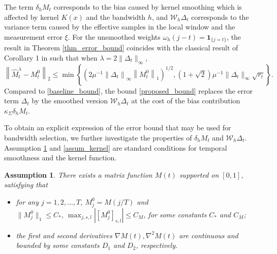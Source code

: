 \documentclass[12pt]{article}
\newtheorem{assump}{Assumption}
\begin{document}
  The term $\delta_h M_t$ corresponds to the bias caused by kernel smoothing which is affected by kernel $K(x)$ and the bandwidth $h$, and $\mathcal{W}_h\Delta_{t}$ corresponds to the variance term caused by the effective samples in the local window and the measurement error $\xi$. 
  For the unsmoothed weights $\omega_h(j-t)=\mathbf{1}_{\{j=t\}}$, the result in Theorem \ref{thm_error_bound} coincides with the classical result of Corollary 1 in \cite{koltchinskii_nuclear-norm_2011} such that when $\lambda = 2\|\Delta_t\|_{\infty}$,
  \begin{equation}\label{baseline_bound}
  \left\|\widehat{M}_t^\lambda - M_t^0 \right\|_2 \le \min\left\{\left(2\mu^{-1}\left\|\Delta_t\right\|_{\infty}\left\|M_t^0\right\|_1\right)^{1/2},{(1+\sqrt{2})}{\mu^{-1}}{\|\Delta_t\|_{\infty}}\sqrt{r_t}\right\}.
  \end{equation} 
  Compared to \eqref{baseline_bound}, the  bound \eqref{proposed_bound} replaces the error term $\Delta_t$ by the smoothed version $\mathcal{W}_h\Delta_t$ at the cost of the bias contribution $\kappa_\Sigma\delta_hM_t$. 

  To obtain an explicit expression of the error bound that may be used for bandwidth selection, we further investigate the properties of $\delta_hM_t$ and $\mathcal{W}_h\Delta_t$. %
  Assumption \ref{assump_M} and \ref{assum_kernel} are standard conditions for temporal smoothness and the kernel function.

  \begin{assump}
  \label{assump_M}
  There exists a matrix function $M(t)$ supported on $[0,1]$, satisfying that
  \begin{itemize}
  \item[1.] for any $j=1,2,\dots,T$, $M_j^0 = M(j/T)$ and $\|M_j^0\|_1\le C_*,\ \max_{j,s,l}|[M_j^0]_{s,l}|\le C_M$, for some constants $C_*$ and $C_M$;
  \item[2.] the first and second derivatives $\nabla M(t),\nabla^2 M(t)$ are continuous and bounded by some constants $D_1$ and $D_2$, respectively.
  \end{itemize}
  \end{assump}
\end{document}
